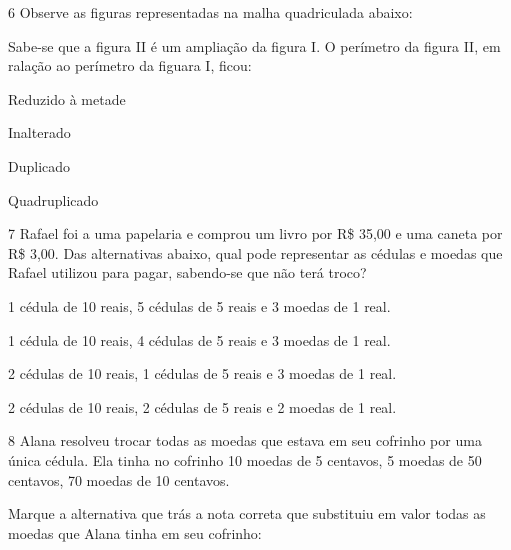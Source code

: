 \num{6} Observe as figuras representadas na malha quadriculada abaixo:


Sabe-se que a figura II é um ampliação da figura I. O perímetro da
figura II, em ralação ao perímetro da figuara I, ficou:

\begin{escolha}
\item
  Reduzido à metade
\item
  Inalterado
\item
  Duplicado
\item
  Quadruplicado
\end{escolha}


\num{7} Rafael foi a uma papelaria e comprou um livro por R\$ 35,00 e uma
caneta por R\$ 3,00. Das alternativas abaixo, qual pode representar as
cédulas e moedas que Rafael utilizou para pagar, sabendo-se que não terá
troco?

\begin{escolha}
\item
  1 cédula de 10 reais, 5 cédulas de 5 reais e 3 moedas de 1 real.
\item
  1 cédula de 10 reais, 4 cédulas de 5 reais e 3 moedas de 1 real.
\item
  2 cédulas de 10 reais, 1 cédulas de 5 reais e 3 moedas de 1 real.
\item
  2 cédulas de 10 reais, 2 cédulas de 5 reais e 2 moedas de 1 real.
\end{escolha}


\num{8} Alana resolveu trocar todas as moedas que estava em seu cofrinho
por uma única cédula. Ela tinha no cofrinho 10 moedas de 5 centavos, 5
moedas de 50 centavos, 70 moedas de 10 centavos.

Marque a alternativa que trás a nota correta que substituiu em valor
todas as moedas que Alana tinha em seu cofrinho:

